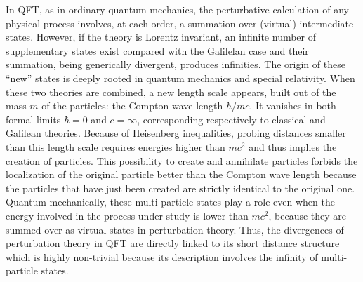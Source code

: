 \documentclass[floatfix,twocolumn,preprintnumbers,amsmath,amssymb,prb]{revtex4}
\begin{document}
In QFT, as in ordinary quantum mechanics, 
the perturbative calculation of any physical process involves, at
each order, a summation over (virtual) intermediate states.
However, if the theory is Lorentz invariant, an infinite number
of supplementary states exist compared with the Galilelan case
and their summation, being generically divergent,
produces infinities. The origin of these
``new'' states is deeply rooted in quantum mechanics and 
special relativity. When these two theories are combined, a new
length scale appears, built out of the mass $m$ of the particles:
the Compton wave length
$\hbar/mc$. It vanishes in both formal limits
$\hbar=0$ and $c=\infty$, corresponding respectively to classical
and Galilean theories. Because of Heisenberg inequalities,
probing distances smaller than this length scale requires energies
higher than $m c^2$ and thus implies the creation of particles.
This possibility to create and annihilate particles forbids the
localization of the original particle better than the Compton wave
length because the particles that have just been created are
strictly identical to the original one. Quantum mechanically,
these multi-particle states play a role even when the energy
involved in the process under study is lower than $m c^2$, because
they are summed over as virtual states in perturbation theory.
Thus, the divergences of perturbation theory in QFT are directly
linked to its short distance structure which is highly non-trivial
because its description involves the infinity of multi-particle
states.
\end{document}
